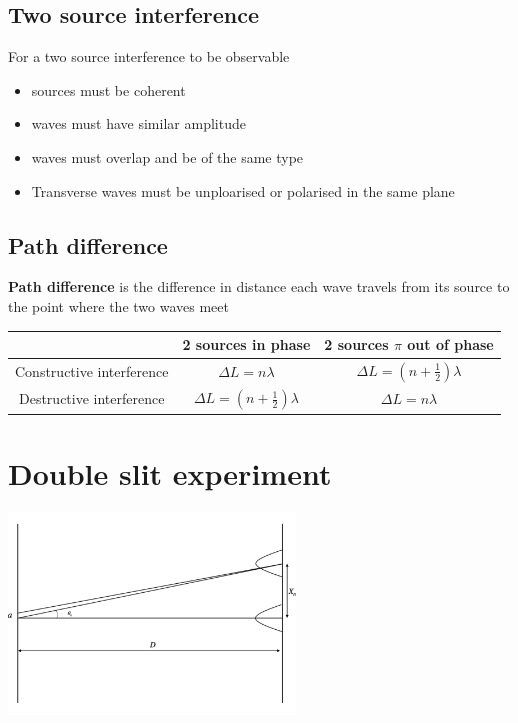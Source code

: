 \documentclass[a4paper, 10pt]{article}
\begin{document}
\subsection{Two source interference}
For a two source interference to be observable
\begin{itemize}
   \item sources must be coherent
   \item waves must have similar amplitude
   \item waves must overlap and be of the same type
   \item Transverse waves must be unploarised or polarised in the same plane
\end{itemize}	

\subsection{Path difference}
\begin{framed}
   \textbf{Path difference} is the difference in distance each wave travels from its source to the point where the two waves meet
\end{framed}	

\begin{center}
   \begin{tabular}{c | c | c}
      & 2 sources in phase & 2 sources $\pi$ out of phase \\
      \hline
      Constructive interference & $\Delta L = n \lambda$ & $\Delta L = (n + \frac{1}{2}) \lambda$  \\
      \hline
      Destructive interference & $\Delta L = (n+ \frac{1}{2}) \lambda$ & $\Delta L = n \lambda$  \\
      \hline
   \end{tabular}
\end{center}

\section{Double slit experiment}
\begin{minipage}{\textwidth}
   \begin{center}
\includegraphics[trim = 50 50 50 50, width=3in]{figures/8.pdf} 
   \end{center}	
\end{minipage}	
\end{document}
